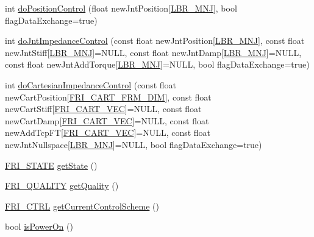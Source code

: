 {\bf }\par
\begin{DoxyCompactItemize}
\item 
int \hyperlink{group__friRemoteLib_ga02a93eecbbb5dba0e5c52f4b89015966}{do\-Position\-Control} (float new\-Jnt\-Position\mbox{[}\hyperlink{friComm_8h_a14d10dff3deb8105d27539540b23ed6e}{\-L\-B\-R\-\_\-\-M\-N\-J}\mbox{]}, bool flag\-Data\-Exchange=true)
\item 
int \hyperlink{group__friRemoteLib_gac10d3cad03b474f65c140448b1fa2cad}{do\-Jnt\-Impedance\-Control} (const float new\-Jnt\-Position\mbox{[}\hyperlink{friComm_8h_a14d10dff3deb8105d27539540b23ed6e}{\-L\-B\-R\-\_\-\-M\-N\-J}\mbox{]}, const float new\-Jnt\-Stiff\mbox{[}\hyperlink{friComm_8h_a14d10dff3deb8105d27539540b23ed6e}{\-L\-B\-R\-\_\-\-M\-N\-J}\mbox{]}=\-N\-U\-L\-L, const float new\-Jnt\-Damp\mbox{[}\hyperlink{friComm_8h_a14d10dff3deb8105d27539540b23ed6e}{\-L\-B\-R\-\_\-\-M\-N\-J}\mbox{]}=\-N\-U\-L\-L, const float new\-Jnt\-Add\-Torque\mbox{[}\hyperlink{friComm_8h_a14d10dff3deb8105d27539540b23ed6e}{\-L\-B\-R\-\_\-\-M\-N\-J}\mbox{]}=\-N\-U\-L\-L, bool flag\-Data\-Exchange=true)
\item 
int \hyperlink{group__friRemoteLib_gacb42502457e2c5077eefb2f53dd48a18}{do\-Cartesian\-Impedance\-Control} (const float new\-Cart\-Position\mbox{[}\hyperlink{friComm_8h_a6a3464c8f97968859a8e68c18a414297}{\-F\-R\-I\-\_\-\-C\-A\-R\-T\-\_\-\-F\-R\-M\-\_\-\-D\-I\-M}\mbox{]}, const float new\-Cart\-Stiff\mbox{[}\hyperlink{friComm_8h_a1286cc3f1315de7fac9fed0e6e4b98cb}{\-F\-R\-I\-\_\-\-C\-A\-R\-T\-\_\-\-V\-E\-C}\mbox{]}=\-N\-U\-L\-L, const float new\-Cart\-Damp\mbox{[}\hyperlink{friComm_8h_a1286cc3f1315de7fac9fed0e6e4b98cb}{\-F\-R\-I\-\_\-\-C\-A\-R\-T\-\_\-\-V\-E\-C}\mbox{]}=\-N\-U\-L\-L, const float new\-Add\-Tcp\-F\-T\mbox{[}\hyperlink{friComm_8h_a1286cc3f1315de7fac9fed0e6e4b98cb}{\-F\-R\-I\-\_\-\-C\-A\-R\-T\-\_\-\-V\-E\-C}\mbox{]}=\-N\-U\-L\-L, const float new\-Jnt\-Nullspace\mbox{[}\hyperlink{friComm_8h_a14d10dff3deb8105d27539540b23ed6e}{\-L\-B\-R\-\_\-\-M\-N\-J}\mbox{]}=\-N\-U\-L\-L, bool flag\-Data\-Exchange=true)
\end{DoxyCompactItemize}

{\bf }\par
\begin{DoxyCompactItemize}
\item 
\hyperlink{friComm_8h_afcbd505d01c334d4ed22eff058dcf097}{\-F\-R\-I\-\_\-\-S\-T\-A\-T\-E} \hyperlink{classfriRemote_aff1c11d9a4f16417388db5885ccbfc0c}{get\-State} ()
\item 
\hyperlink{friComm_8h_acbc584f97d45e6a3dc281965dbdf3517}{\-F\-R\-I\-\_\-\-Q\-U\-A\-L\-I\-T\-Y} \hyperlink{classfriRemote_a98ccbde061e2f511b49deb72c698648e}{get\-Quality} ()
\item 
\hyperlink{friComm_8h_a2f82e8f3ba130ca37066f473ad0fdccf}{\-F\-R\-I\-\_\-\-C\-T\-R\-L} \hyperlink{classfriRemote_a1b608b1c77596b61e55987a206ebc7c8}{get\-Current\-Control\-Scheme} ()
\item 
bool \hyperlink{classfriRemote_ab2f87884e0e067f29f9c23584bd13d86}{is\-Power\-On} ()
\end{DoxyCompactItemize}

